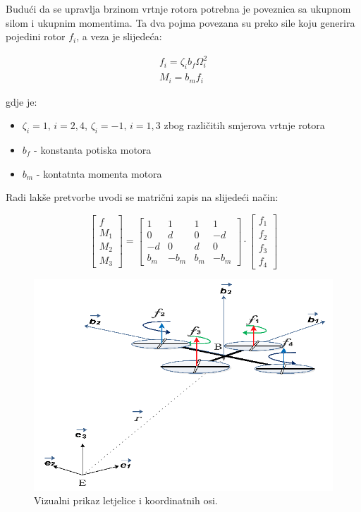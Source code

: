 \documentclass[times, utf8, diplomski]{fer}
\begin{document}
\noindent Budući da se upravlja brzinom vrtnje rotora potrebna je poveznica sa ukupnom silom i ukupnim momentima. Ta dva pojma povezana su preko sile koju generira pojedini rotor $f_i$, a veza je slijedeća:

\begin{gather}
	f_i = \zeta_i b_f \Omega_{i}^2 \\
	M_i = b_m f_i
\end{gather}

gdje je:
\begin{itemize}
	\item $\zeta_i = 1,\, i = 2, 4$, $\zeta_i = -1,\, i=1,3$ zbog različitih smjerova vrtnje rotora
	\item $b_f$ - konstanta potiska motora
	\item $b_m$ - kontatnta momenta motora
\end{itemize}

\newpage
\clearpage

Radi lakše pretvorbe uvodi se matrični zapis na slijedeći način: 

\begin{equation}
	\begin{bmatrix}
		f \\
		M_1 \\
		M_2 \\
		M_3 
	\end{bmatrix} 
	=
	\begin{bmatrix}
		1	&	1	&	1	&	1 \\
		0	&	d	&	0	&	-d \\
		-d 	&	0	&	d	&	0 \\
		b_m &	-b_m	& 	b_m	& -b_m
	\end{bmatrix}
	\cdot
	\begin{bmatrix}
		f_1 \\
		f_2 \\
		f_3 \\
		f_4
	\end{bmatrix}
\end{equation}

\begin{figure}[h!]
	\includegraphics[width=\textwidth]{figures/model.png}
	\caption{Vizualni prikaz letjelice i koordinatnih osi.}
\end{figure}
\end{document}
